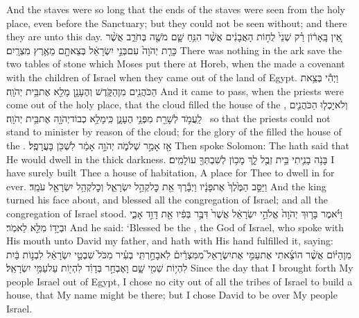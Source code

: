 {And the staves were so long that the ends of the staves were seen from the holy place, even before the Sanctuary; but they could not be seen without; and there they are unto this day.}
{אֵ֚ין בָּֽאָר֔וֹן רַ֗ק שְׁנֵי֙ לֻח֣וֹת הָאֲבָנִ֔ים אֲשֶׁ֨ר הִנִּ֥חַ שָׁ֛ם מֹשֶׁ֖ה בְּחֹרֵ֑ב אֲשֶׁ֨ר כָּרַ֤ת יְהֹוָה֙ עִם\maqqaf בְּנֵ֣י יִשְׂרָאֵ֔ל בְּצֵאתָ֖ם מֵאֶ֥רֶץ מִצְרָֽיִם׃}
{There was nothing in the ark save the two tables of stone which Moses put there at Horeb, when the \lord\space made a covenant with the children of Israel when they came out of the land of Egypt.}
{וַיְהִ֕י בְּצֵ֥את הַכֹּהֲנִ֖ים מִן\maqqaf הַקֹּ֑דֶשׁ וְהֶעָנָ֥ן מָלֵ֖א אֶת\maqqaf בֵּ֥ית יְהֹוָֽה׃}
{And it came to pass, when the priests were come out of the holy place, that the cloud filled the house of the \lord,}
{וְלֹא\maqqaf יָכְל֧וּ הַכֹּהֲנִ֛ים לַֽעֲמֹ֥ד לְשָׁרֵ֖ת מִפְּנֵ֥י הֶעָנָ֑ן כִּֽי\maqqaf מָלֵ֥א כְבוֹד\maqqaf יְהֹוָ֖ה אֶת\maqqaf בֵּ֥ית יְהֹוָֽה׃ \petucha }
{so that the priests could not stand to minister by reason of the cloud; for the glory of the \lord\space filled the house of the \lord.}
{אָ֖ז אָמַ֣ר שְׁלֹמֹ֑ה יְהֹוָ֣ה אָמַ֔ר לִשְׁכֹּ֖ן בָּעֲרָפֶֽל׃}
{Then spoke Solomon: The \lord\space hath said that He would dwell in the thick darkness.}
{בָּנֹ֥ה בָנִ֛יתִי בֵּ֥ית זְבֻ֖ל לָ֑ךְ מָכ֥וֹן לְשִׁבְתְּךָ֖ עוֹלָמִֽים׃}
{I have surely built Thee a house of habitation, A place for Thee to dwell in for ever.}
{וַיַּסֵּ֤ב הַמֶּ֙לֶךְ֙ אֶת\maqqaf פָּנָ֔יו וַיְבָ֕רֶךְ אֵ֖ת כׇּל\maqqaf קְהַ֣ל יִשְׂרָאֵ֑ל וְכׇל\maqqaf קְהַ֥ל יִשְׂרָאֵ֖ל עֹמֵֽד׃}
{And the king turned his face about, and blessed all the congregation of Israel; and all the congregation of Israel stood.}
{וַיֹּ֗אמֶר בָּר֤וּךְ יְהֹוָה֙ אֱלֹהֵ֣י יִשְׂרָאֵ֔ל אֲשֶׁר֙ דִּבֶּ֣ר בְּפִ֔יו אֵ֖ת דָּוִ֣ד אָבִ֑י וּבְיָד֥וֹ מִלֵּ֖א לֵאמֹֽר׃}
{And he said: ‘Blessed be the \lord, the God of Israel, who spoke with His mouth unto David my father, and hath with His hand fulfilled it, saying:}
{מִן\maqqaf הַיּ֗וֹם אֲשֶׁ֨ר הוֹצֵ֜אתִי אֶת\maqqaf עַמִּ֣י אֶת\maqqaf יִשְׂרָאֵל֮ מִמִּצְרַ֒יִם֒ לֹֽא\maqqaf בָחַ֣רְתִּֽי בְעִ֗יר מִכֹּל֙ שִׁבְטֵ֣י יִשְׂרָאֵ֔ל לִבְנ֣וֹת בַּ֔יִת לִהְי֥וֹת שְׁמִ֖י שָׁ֑ם וָאֶבְחַ֣ר בְּדָוִ֔ד לִהְי֖וֹת עַל\maqqaf עַמִּ֥י יִשְׂרָאֵֽל׃}
{Since the day that I brought forth My people Israel out of Egypt, I chose no city out of all the tribes of Israel to build a house, that My name might be there; but I chose David to be over My people Israel.}
